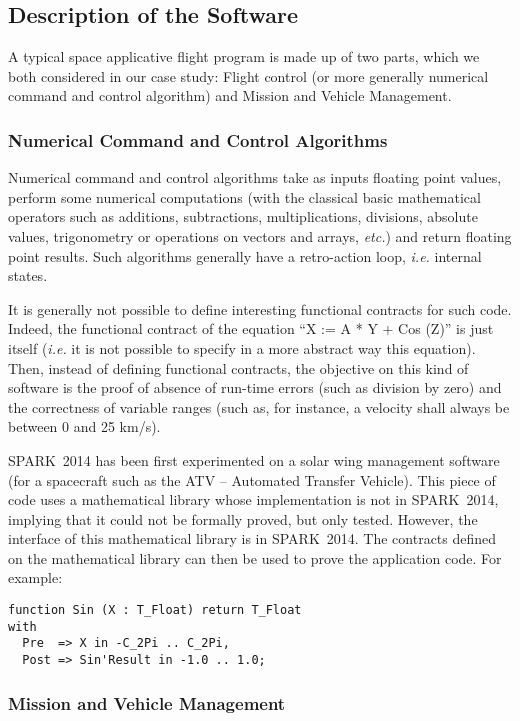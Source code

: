 \documentclass[10pt,a4paper,twocolumn]{article}
\newcommand{\newspark}{SPARK~2014\xspace}
\newcommand{\etc}{\textit{etc.}\xspace}
\newcommand{\ie}{\textit{i.e.}\xspace}
\begin{document}
\subsection{Description of the Software}

A typical space applicative flight program is made up of two parts, which we
both considered in our case study:
Flight control (or more generally numerical command and control algorithm) and
Mission and Vehicle Management.

\subsubsection{Numerical Command and Control Algorithms}

Numerical command and control algorithms take as inputs floating point values,
perform some numerical computations (with the classical basic mathematical
operators such as additions, subtractions, multiplications, divisions, absolute
values, trigonometry or operations on vectors and arrays, \etc) and return
floating point results. Such algorithms generally have a retro-action loop, \ie
internal states.

It is generally not possible to define interesting functional contracts for
such code. Indeed, the functional contract of the equation
``X := A * Y + Cos (Z)''
is just itself (\ie it is not possible to specify in a more abstract way this
equation). Then, instead of defining functional contracts, the objective on
this kind of software is the proof of absence of run-time errors (such as
division by zero) and the correctness of variable ranges (such as, for
instance, a velocity shall always be between 0 and 25 km/s).

\newspark has been first experimented on a solar wing management software (for a spacecraft such as the ATV -- Automated Transfer Vehicle).
This piece of code uses a mathematical library whose implementation is not in
\newspark, implying that it could not be formally proved, but only tested.
However, the interface of this mathematical library is in \newspark. The
contracts defined on the mathematical library can then be used to prove the
application code. For example:

\begin{lstlisting}
function Sin (X : T_Float) return T_Float
with
  Pre  => X in -C_2Pi .. C_2Pi,
  Post => Sin'Result in -1.0 .. 1.0;
\end{lstlisting}

\subsubsection{Mission and Vehicle Management}
\end{document}
